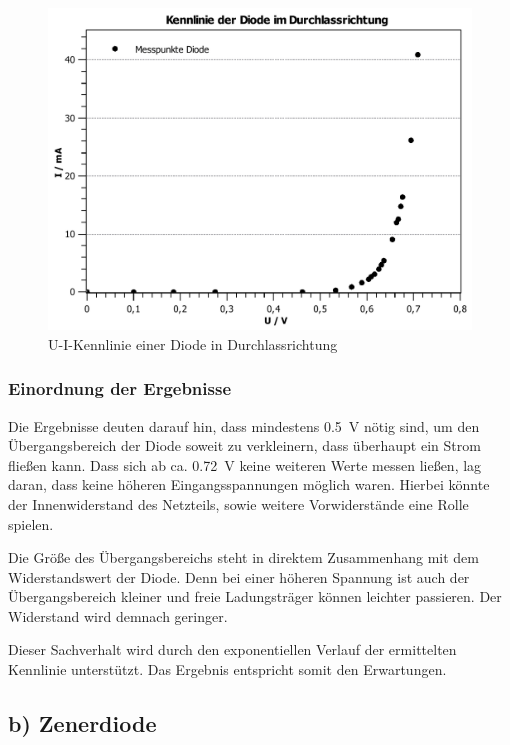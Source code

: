 \documentclass[11pt,a4paper,titlepage, ngerman]{article}
\begin{document}
				\begin{figure}
					\centering
					\includegraphics[width=\textwidth]{KennlinieDiode.pdf}
					\caption{U-I-Kennlinie einer Diode in Durchlassrichtung}
					\label{KL a}
				\end{figure}
			
			\subsubsection*{Einordnung der Ergebnisse}
							
				Die Ergebnisse deuten darauf hin, dass mindestens \SI{0.5}{\V} nötig sind, um den Übergangsbereich der Diode soweit zu verkleinern, dass überhaupt ein Strom fließen kann. 				
				Dass sich ab ca. \SI{0.72}{\V} keine weiteren Werte messen  ließen, lag daran, dass keine höheren Eingangsspannungen möglich waren. Hierbei könnte der Innenwiderstand des Netzteils, sowie weitere Vorwiderstände eine Rolle spielen.

				Die Größe des Übergangsbereichs steht in direktem Zusammenhang mit dem Widerstandswert der Diode.
				Denn bei einer höheren Spannung ist auch der Übergangsbereich kleiner und freie Ladungsträger können leichter passieren.
				Der Widerstand wird demnach geringer.
				
				Dieser Sachverhalt wird durch den exponentiellen Verlauf der ermittelten Kennlinie unterstützt.
				Das Ergebnis entspricht somit den Erwartungen.
				
		\subsection{b) Zenerdiode} 
			
\end{document}
